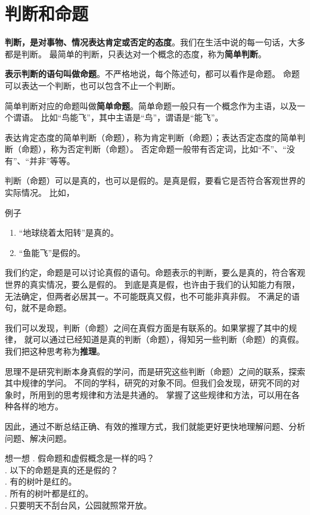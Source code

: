\documentclass[12pt,UTF8,a4paper]{article}
\begin{document}
\section{判断和命题}

\textbf{判断，是对事物、情况表达肯定或否定的态度}。我们在生活中说的每一句话，大多都是判断。
最简单的判断，只表达对一个概念的态度，称为\textbf{简单判断}。

\textbf{表示判断的语句叫做命题}。不严格地说，每个陈述句，都可以看作是命题。
命题可以表达一个判断，也可以包含不止一个判断。

简单判断对应的命题叫做\textbf{简单命题}。简单命题一般只有一个概念作为主语，以及一个谓语。
比如“鸟能飞”，其中主语是“鸟”，谓语是“能飞”。

表达肯定态度的简单判断（命题），称为肯定判断（命题）；表达否定态度的简单判断（命题），称为否定判断（命题）。
否定命题一般带有否定词，比如“不”、“没有”、“并非”等等。

判断（命题）可以是真的，也可以是假的。是真是假，要看它是否符合客观世界的实际情况。
比如，
\begin{blockin}{例子}
    \begin{enumerate}
        \item “地球绕着太阳转”是真的。
        \item “鱼能飞”是假的。
    \end{enumerate}
\end{blockin}

我们约定，命题是可以讨论真假的语句。命题表示的判断，要么是真的，符合客观世界的真实情况，要么是假的。
到底是真是假，也许由于我们的认知能力有限，无法确定，但两者必居其一。不可能既真又假，也不可能非真非假。
不满足的语句，就不是命题。

我们可以发现，判断（命题）之间在真假方面是有联系的。如果掌握了其中的规律，
就可以通过已经知道是真的判断（命题），得知另一些判断（命题）的真假。我们把这种思考称为\textbf{推理}。

思理不是研究判断本身真假的学问，而是研究这些判断（命题）之间的联系，探索其中规律的学问。
不同的学科，研究的对象不同。但我们会发现，研究不同的对象时，所用到的思考规律和方法是共通的。
掌握了这些规律和方法，可以用在各种各样的地方。

因此，通过不断总结正确、有效的推理方式，我们就能更好更快地理解问题、分析问题、解决问题。

\begin{blockaft}{想一想}
    . 假命题和虚假概念是一样的吗？\\
    . 以下的命题是真的还是假的？\\
    . 有的树叶是红的。 \\
    . 所有的树叶都是红的。\\
    . 只要明天不刮台风，公园就照常开放。
\end{blockaft}
\end{document}
